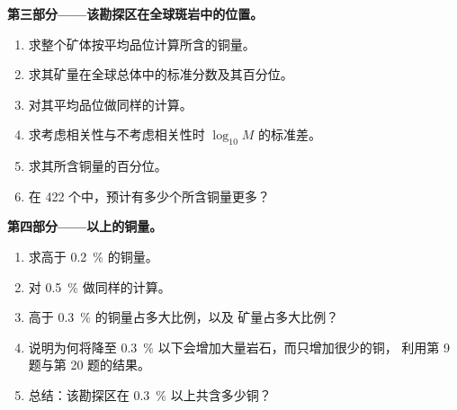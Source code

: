 \begin{problem}
\noindent\textbf{第三部分——该勘探区在全球斑岩中的位置。}
\begin{enumerate}[resume]
  \item 求整个矿体按平均品位计算所含的铜量。
  \item 求其矿量在全球总体中的标准分数及其百分位。
  \item 对其平均品位做同样的计算。
  \item 求考虑相关性与不考虑相关性时 $\log_{10} M$ 的标准差。
  \item 求其所含铜量的百分位。
  \item 在 422 个中，预计有多少个所含铜量更多？
\end{enumerate}

\noindent\textbf{第四部分——以上的铜量。}
\begin{enumerate}[resume]
  \item 求高于 \qty{0.2}{\percent} 的铜量。
  \item 对 \qty{0.5}{\percent} 做同样的计算。
  \item 高于 \qty{0.3}{\percent} 的铜量占多大比例，以及
        矿量占多大比例？
  \item 说明为何将降至 \qty{0.3}{\percent} 以下会增加大量岩石，而只增加很少的铜，
        利用第 9 题与第 20 题的结果。
  \item 总结：该勘探区在 \qty{0.3}{\percent} 以上共含多少铜？
\end{enumerate}
\end{problem}
